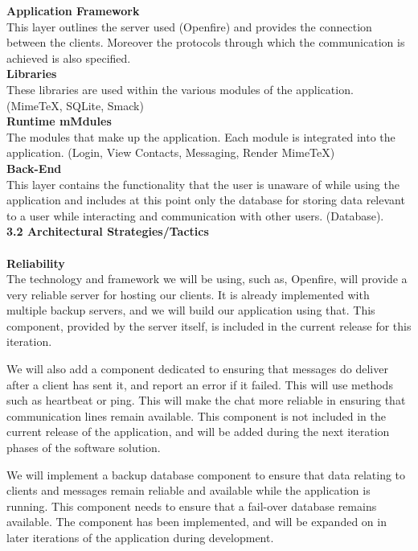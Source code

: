 \documentclass[29pt,a4paper]{moderncv}
\begin{document}
			\noindent\textbf{Application Framework}\\
			This layer outlines the server used (Openfire) and provides the connection between the clients. Moreover the protocols through which the communication is achieved is also specified.\\
			
			\noindent\textbf{Libraries}\\
			These libraries are used within the various modules of the application. (MimeTeX, SQLite, Smack)\\
			
			\noindent\textbf{Runtime mMdules}\\
			The modules that make up the application.  Each module is integrated into the application. (Login, View Contacts, Messaging, Render MimeTeX)\\
			
			\noindent\textbf{Back-End}\\
			This layer contains the functionality that the user is unaware of while using the application and includes at this point only the database for storing data relevant to a user while interacting and communication with other users. (Database).\\
			
		\vspace{5mm}
\newpage		
		\noindent \textbf{3.2 Architectural Strategies/Tactics} \\
			\\ \textbf{Reliability} 
				\\The technology and framework we will be using, such as, Openfire, will provide a very reliable server for hosting our clients. It is already implemented with multiple backup servers, and we will build our application using that. This component, provided by the server itself, is included in the current release for this iteration.
				
				We will also add a component dedicated to ensuring that messages do deliver after a client has sent it, and report an error if it failed. This will use methods such as heartbeat or ping. This will make the chat more reliable in ensuring that communication lines remain available. This component is not included in the current release of the application, and will be added during the next iteration phases of the software solution. 
				
				We will implement a backup database component to ensure that data relating to clients and messages remain reliable and available while the application is running. This component needs to ensure that a fail-over database remains available. The component has been implemented, and will be expanded on in later iterations of the application during development.
				\\
			
\end{document}

